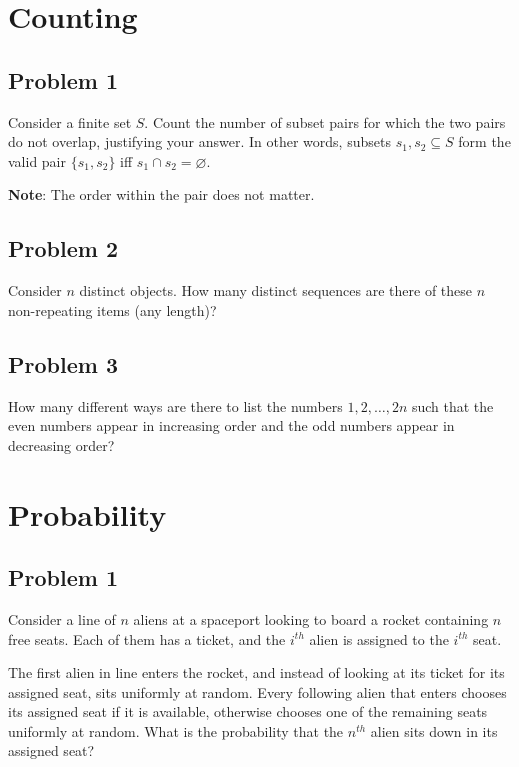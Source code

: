 \documentclass[12pt,letterpaper]{article}
\newcommand\note[1]{\textbf{Note}: #1}
\newcounter{enum22i}
\begin{document}
\section*{Counting}

\subsection*{Problem 1}{{\setcounter{enum22i}{0}
Consider a finite set $S$. Count the number of subset pairs for which the two pairs do not overlap, justifying your answer. In other words, subsets $s_1,s_2 \subseteq S$ form the valid pair $\{s_1,s_2\}$ iff $s_1 \cap s_2 = \varnothing$.

\note{The order within the pair does not matter.}
}
}

\subsection*{Problem 2}{{\setcounter{enum22i}{0}

Consider $n$ distinct objects. How many distinct sequences are there of these $n$ non-repeating items (any length)?
}
}

\subsection*{Problem 3}{{\setcounter{enum22i}{0}
	How many different ways are there to list the numbers $1,
	2, \ldots, 2n$ such that the even numbers appear in increasing order
	and the odd numbers appear in decreasing order?
}
}

\newpage

\section*{Probability}

\subsection*{Problem 1}{{\setcounter{enum22i}{0}
Consider a line of $n$ aliens at a spaceport looking to board a rocket containing $n$ free seats. Each of them has a ticket, and the $i^{th}$ alien is assigned to the $i^{th}$ seat.

The first alien in line enters the rocket, and instead of looking at its ticket for its assigned seat, sits uniformly at random. Every following alien that enters chooses its assigned seat if it is available, otherwise chooses one of the remaining seats uniformly at random. What is the probability that the $n^{th}$ alien sits down in its assigned seat?
}
}
\end{document}
